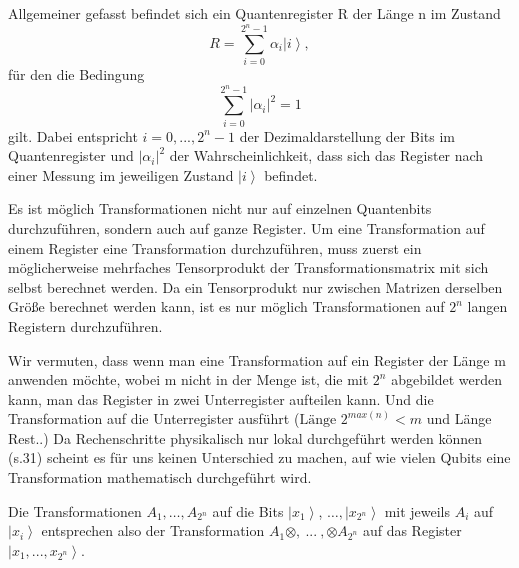 Allgemeiner gefasst befindet sich ein Quantenregister R der Länge n im Zustand 
$$R=\sum_{i=0}^{2^n-1}{\alpha_i\left|\left.i\right\rangle\right.},$$
für den die Bedingung
$$\sum_{i=0}^{2^n-1}\left|\alpha_i\right|^2=1$$
gilt. Dabei entspricht $i=0,...,2^n-1$ der Dezimaldarstellung der Bits im Quantenregister und $\left|\alpha_i\right|^2$ der Wahrscheinlichkeit, dass sich das Register nach einer Messung im jeweiligen Zustand $\left|\left.i\right\rangle\right.$ befindet.

Es ist möglich Transformationen nicht nur auf einzelnen Quantenbits durchzuführen, sondern auch auf ganze Register. Um eine Transformation auf einem Register eine Transformation durchzuführen, muss zuerst ein möglicherweise mehrfaches Tensorprodukt der Transformationsmatrix mit sich selbst berechnet werden. Da ein Tensorprodukt nur zwischen Matrizen derselben Größe berechnet werden kann, ist es nur möglich Transformationen auf $2^n$ langen Registern durchzuführen. 


Wir vermuten, dass wenn man eine Transformation auf ein Register der Länge m anwenden möchte, wobei m nicht in der Menge ist, die mit $2^n$ abgebildet werden kann, man das Register in zwei Unterregister aufteilen kann. Und die Transformation auf die Unterregister ausführt ($\text{Länge }2^{max(n)} < m$ und Länge Rest..) Da Rechenschritte physikalisch nur lokal durchgeführt werden können (s.31) scheint es für uns keinen Unterschied zu machen, auf wie vielen Qubits eine Transformation mathematisch durchgeführt wird.


Die Transformationen $A_1,\ldots,A_{2^n}$ auf die Bits $\left|\left.x_1\right\rangle\right.$, $\ldots,\left|\left.x_{2^n}\right\rangle\right.$ mit jeweils $A_i$ auf $\left|\left.x_i\right\rangle\right.$ entsprechen also der Transformation $A_1\otimes,\ ...\ ,\otimes A_{2^n}$ auf das Register $\left|\left.x_1,...,x_{2^n}\right\rangle\right.$.

